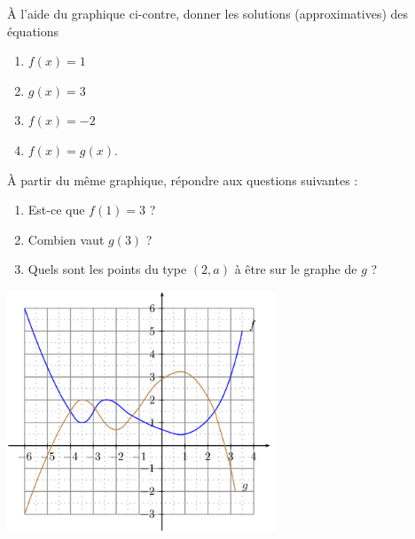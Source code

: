 
\begin{exercice}\label{exoSeconde-0070}

    \begin{multicols}{2}

        À l'aide du graphique ci-contre, donner les solutions (approximatives) des équations
        \begin{enumerate}
            \item
                \( f(x)=1\)
            \item
                \( g(x)=3\)
            \item
                \( f(x)=-2\)
            \item
                $f(x)=g(x)$.
        \end{enumerate}

        À partir du même graphique, répondre aux questions suivantes :
        \begin{enumerate}
            \item
                Est-ce que \( f(1)=3\) ?
            \item
                Combien vaut \( g(3)\) ?
            \item
                Quels sont les points du type \( (2,a)\) à être sur le graphe de \( g\) ?
        \end{enumerate}

        \columnbreak

%

\includegraphics[width=8.0cm]{Picture_FIGLabelFigExResolutionOSiaMSPICTExResolutionOSiaMS-for_eps.png}


    \end{multicols}

\end{exercice}
